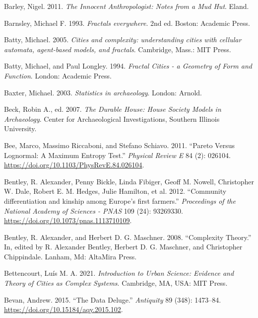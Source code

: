 \documentclass[
  12pt,
  a4paper, twoside]{book}
\newlength{\cslhangindent}
\newlength{\cslentryspacingunit} %
\newenvironment{CSLReferences}[2] %
 {%
  \setlength{\parindent}{0pt}
  \ifodd #1
  \let\oldpar\par
  \def\par{\hangindent=\cslhangindent\oldpar}
  \fi
  \setlength{\parskip}{#2\cslentryspacingunit}
 }%
 {}
\begin{document}
\begin{CSLReferences}{1}{0}
\leavevmode{}%
Barley, Nigel. 2011. \emph{The Innocent Anthropologist: Notes from a Mud Hut}. Eland.

\leavevmode{}%
Barnsley, Michael F. 1993. \emph{Fractals everywhere}. 2nd ed. Boston: Academic Press.

\leavevmode{}%
Batty, Michael. 2005. \emph{Cities and complexity: understanding cities with cellular automata, agent-based models, and fractals}. Cambridge, Mass.: MIT Press.

\leavevmode{}%
Batty, Michael, and Paul Longley. 1994. \emph{Fractal Cities - a Geometry of Form and Function}. London: Academic Press.

\leavevmode{}%
Baxter, Michael. 2003. \emph{Statistics in archaeology}. London: Arnold.

\leavevmode{}%
Beck, Robin A., ed. 2007. \emph{The Durable House: House Society Models in Archaeology}. Center for Archaeological Investigations, Southern Illinois University.

\leavevmode{}%
Bee, Marco, Massimo Riccaboni, and Stefano Schiavo. 2011. {``Pareto Versus Lognormal: A Maximum Entropy Test.''} \emph{Physical Review E} 84 (2): 026104. \url{https://doi.org/10.1103/PhysRevE.84.026104}.

\leavevmode{}%
Bentley, R. Alexander, Penny Bickle, Linda Fibiger, Geoff M. Nowell, Christopher W. Dale, Robert E. M. Hedges, Julie Hamilton, et al. 2012. {``Community differentiation and kinship among Europe{'}s first farmers.''} \emph{Proceedings of the National Academy of Sciences - PNAS} 109 (24): 93269330. \url{https://doi.org/10.1073/pnas.1113710109}.

\leavevmode{}%
Bentley, R. Alexander, and Herbert D. G. Maschner. 2008. {``Complexity Theory.''} In, edited by R. Alexander Bentley, Herbert D. G. Maschner, and Christopher Chippindale. Lanham, Md: AltaMira Press.

\leavevmode{}%
Bettencourt, Luís M. A. 2021. \emph{Introduction to Urban Science: Evidence and Theory of Cities as Complex Systems}. Cambridge, MA, USA: MIT Press.

\leavevmode{}%
Bevan, Andrew. 2015. {``The Data Deluge.''} \emph{Antiquity} 89 (348): 1473--84. \url{https://doi.org/10.15184/aqy.2015.102}.


\end{CSLReferences}
\end{document}
